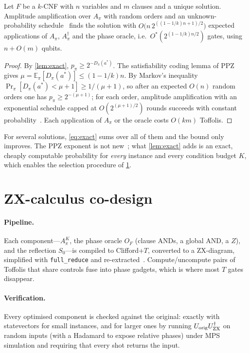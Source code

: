 \begin{theorem}\label{thm:main}
Let $F$ be a $k$-CNF with $n$ variables and $m$ clauses and a unique solution. Amplitude amplification over $A_\pi$ with random orders and an unknown-probability schedule~\cite{bbht1998,bhmt2002} finds the solution with $O\!\big(n\,2^{((1-1/k)n+1)/2}\big)$ expected applications of $A_\pi$, $A_\pi^\dagger$ and the phase oracle, i.e.\ $O^*(2^{(1-1/k)n/2})$ gates, using $n+O(m)$ qubits.
\end{theorem}
\begin{proof}
By \cref{lem:exact}, $p_\pi\ge 2^{-D_\pi(a^*)}$. The satisfiability coding lemma of PPZ~\cite{ppz1999} gives $\mu=\mathbb E_\pi[D_\pi(a^*)]\le(1-1/k)n$. By Markov's inequality $\Pr_\pi[D_\pi(a^*)<\mu+1]\ge 1/(\mu+1)$, so after an expected $O(n)$ random orders one has $p_\pi\ge2^{-(\mu+1)}$; for each order, amplitude amplification with an exponential schedule capped at $O(2^{(\mu+1)/2})$ rounds succeeds with constant probability~\cite{bbht1998}. Each application of $A_\pi$ or the oracle costs $O(km)$ Toffolis.
\end{proof}
For several solutions, \cref{eq:exact} sums over all of them and the bound only improves. The PPZ exponent is not new~\cite{ambainis2004,dunjko2018}; what \cref{lem:exact} adds is an exact, cheaply computable probability for \emph{every} instance and every condition budget $K$, which enables the selection procedure of \cref{sec:zx}.

\section{ZX-calculus co-design}\label{sec:zx}
\paragraph{Pipeline.} Each component---$A_\pi^K$, the phase oracle $O_F$ (clause ANDs, a global AND, a $Z$), and the reflection $S_0$---is compiled to Clifford+$T$, converted to a ZX-diagram, simplified with \texttt{full\_reduce} and re-extracted~\cite{duncan2020,pyzx}. Compute/uncompute pairs of Toffolis that share controls fuse into phase gadgets, which is where most $T$ gates disappear.
\paragraph{Verification.} Every optimised component is checked against the original: exactly with statevectors for small instances, and for larger ones by running $U_{\rm orig}U_{\rm ZX}^\dagger$ on random inputs (with a Hadamard to expose relative phases) under MPS simulation and requiring that every shot returns the input.

